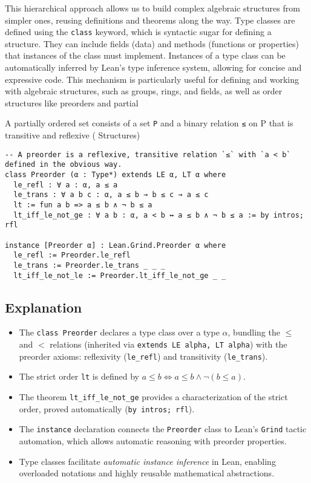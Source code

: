 This hierarchical approach allows us to build complex algebraic structures from simpler ones,
reusing definitions and theorems along the way.
Type classes are defined using the \lstinline[language=lean]|class| keyword, which is syntactic sugar for defining a structure.
They can include fields (data) and methods (functions or properties) that instances of the class
must implement.
Instances of a type class can be automatically inferred by Lean's type inference system,
allowing for concise and expressive code.
This mechanism is particularly useful for defining and working with algebraic structures,
such as groups, rings, and fields, as well as order structures like preorders and partial

A partially ordered set consists of a set \lstinline[language=lean]|P| and a binary relation \lstinline[language=lean]|≤| 
on P that is transitive and reflexive (\cite{mathinlean} Structures)

\begin{lstlisting}[language=lean, caption=Preorder Type Class in Lean]
-- A preorder is a reflexive, transitive relation `≤` with `a < b` defined in the obvious way.
class Preorder (α : Type*) extends LE α, LT α where
  le_refl : ∀ a : α, a ≤ a
  le_trans : ∀ a b c : α, a ≤ b → b ≤ c → a ≤ c
  lt := fun a b => a ≤ b ∧ ¬ b ≤ a
  lt_iff_le_not_ge : ∀ a b : α, a < b ↔ a ≤ b ∧ ¬ b ≤ a := by intros; rfl

instance [Preorder α] : Lean.Grind.Preorder α where
  le_refl := Preorder.le_refl
  le_trans := Preorder.le_trans _ _ _
  lt_iff_le_not_le := Preorder.lt_iff_le_not_ge _ _
\end{lstlisting}

\subsection*{Explanation}

\begin{itemize}
 \item The \texttt{class Preorder} declares a type class over a type 
 \(\alpha\), bundling the \(\leq\) and \(<\) relations 
 (inherited via \texttt{extends LE alpha, LT alpha}) with the
  preorder axioms: reflexivity (\texttt{le\_refl}) and 
  transitivity (\texttt{le\_trans}).
 \item The strict order \texttt{lt} is defined by 
 \(a \le b \iff a \leq b \land \neg(b \leq a)\).
 \item The theorem \texttt{lt\_iff\_le\_not\_ge} provides a characterization of the strict order, proved automatically (\texttt{by intros; rfl}).
 \item The \texttt{instance} declaration connects the \texttt{Preorder} class to Lean’s \texttt{Grind} tactic automation, which allows automatic reasoning with preorder properties.
 \item Type classes facilitate \emph{automatic instance inference} in Lean, enabling overloaded notations and highly reusable mathematical abstractions.
\end{itemize}

